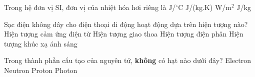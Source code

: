 	\begin{ex}%
		Trong hệ đơn vị SI, đơn vị của nhiệt hóa hơi riêng là
		\choice
		{J/$^\circ$C}
		{J/(kg.K)}
		{W/m$^2$}
		{\True J/kg}
	\end{ex}

	\begin{ex}%
		Sạc điện không dây cho điện thoại di động hoạt động dựa trên hiện tượng nào?
		\choice
		{\True Hiện tượng cảm ứng điện từ}
		{Hiện tượng giao thoa}
		{Hiện tượng điện phân}
		{Hiện tượng khúc xạ ánh sáng}
	\end{ex}

	\begin{ex}%
		Trong thành phần cấu tạo của nguyên tử, \textbf{không} có hạt nào dưới đây?
		\choice
		{Electron}
		{Neutron}
		{Proton}
		{\True Photon}
	\end{ex}

